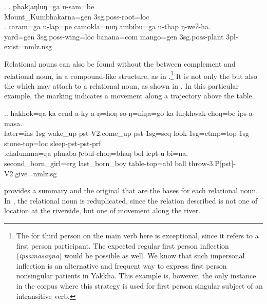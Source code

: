 	\ex. \ag. phakʈaŋluŋ=ga        u-sam=be\\
		Mount\_Kumbhakarna{\sc =gen} {\sc 3sg.poss-}root{\sc =loc}	\\
		  
		\bg. caram=ga    u-lap=pe    camokla=nuŋ   ambibu=ga    u-thap     ŋ-weʔ-ha.\\
		yard{\sc =gen} {\sc 3sg.poss-}wing{\sc =loc} banana{\sc =com} mango{\sc =gen} {\sc 3sg.poss-}plant {\sc 3pl-}exist{\sc [npst]=nmlz.nsg}\\
		 
	
	
Relational nouns can also be found without the  between complement and relational noun, in a compound-like structure, as in  \Next[a].\footnote{The  for third person on the main verb here is exceptional, since it refers to a first person participant. The expected regular first person inflection (\emph{ipsamasaŋna}) would be possible as well. We know that such impersonal inflection is an alternative and frequent way to express first person nonsingular patients in Yakkha. This example is, however, the only instance in the corpus where this strategy is used for first person singular subject of an intransitive verb.} 	It is not only the  but also the  which may attach to a relational noun, as shown in \Next[b]. In this particular example, the  marking indicates a movement along a trajectory above the table.
		
 \ex.\ag. hakhok=ŋa  ka  cend-a-ky-a-ŋ=hoŋ so-ŋ=niŋa=go ka  luŋkhwak-choŋ=be  ips-a-masa.\\
	later{\sc =ins} {\sc 1sg} wake\_up{\sc -pst-V2.come\_up-pst-1sg=seq} look{\sc -1sg=ctmp=top} {\sc 1sg} stone-top{\sc =loc} sleep{\sc [3sg]-pst-pst-prf}\\
	 
	\bg.chalumma=ŋa phuaba ʈebul-choŋ=bhaŋ bol lept-u-bi=na.\\
	second\_born\_girl{\sc =erg} last\_born\_boy table-top{\sc =abl} ball throw{\sc -3.P[pst]-V2.give=nmlz.sg}\\
	
 provides a summary and the original  that are the bases for each relational noun. In \Next, the relational noun is reduplicated, since the relation described is not one of location at the riverside, but one of movement along the river.

